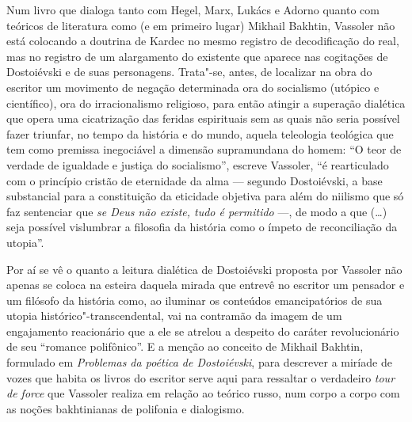 Num livro que dialoga tanto com Hegel, Marx, Lukács e Adorno quanto com
teóricos de literatura como (e em primeiro lugar) Mikhail Bakhtin,
Vassoler não está colocando a doutrina de Kardec no mesmo registro de
decodificação do real, mas no registro de um alargamento do existente
que aparece nas cogitações de Dostoiévski e de suas personagens.
Trata"-se, antes, de localizar na obra do escritor um movimento de
negação determinada ora do socialismo (utópico e científico), ora do
irracionalismo religioso, para então atingir a superação dialética que
opera uma cicatrização das feridas espirituais sem as quais não seria
possível fazer triunfar, no tempo da história e do mundo, aquela
teleologia teológica que tem como premissa inegociável a dimensão
supramundana do homem: ``O teor de verdade de igualdade e justiça do
socialismo'', escreve Vassoler, ``é rearticulado com o princípio cristão
de eternidade da alma --- segundo Dostoiévski, a base substancial para a
constituição da eticidade objetiva para além do niilismo que só faz
sentenciar que \emph{se Deus não existe, tudo é permitido} ---, de modo a
que (\ldots) seja possível vislumbrar a filosofia da história como o ímpeto
de reconciliação da utopia''.

Por aí se vê o quanto a leitura dialética de Dostoiévski proposta por
Vassoler não apenas se coloca na esteira daquela mirada que entrevê no
escritor um pensador e um filósofo da história como, ao iluminar os
conteúdos emancipatórios de sua utopia histórico"-transcendental, vai na
contramão da imagem de um engajamento reacionário que a ele se atrelou a
despeito do caráter revolucionário de seu ``romance polifônico''. E a
menção ao conceito de Mikhail Bakhtin, formulado em \emph{Problemas da
poética de Dostoiévski}, para descrever a miríade de vozes que habita os
livros do escritor serve aqui para ressaltar o verdadeiro \emph{tour de
force} que Vassoler realiza em relação ao teórico russo, num corpo a
corpo com as noções bakhtinianas de polifonia e dialogismo.

